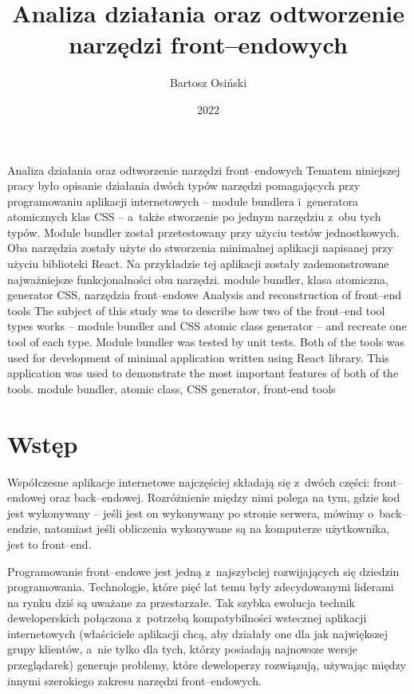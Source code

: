 \documentclass{SGGW-thesis}
\title{Analiza działania oraz odtworzenie narzędzi front--endowych}
\author{Bartosz Osiński}
\date{2022}
\begin{document}
\maketitle
\statementpage
\abstractpage
{Analiza działania oraz odtworzenie narzędzi front–endowych}
{Tematem niniejszej pracy było opisanie działania dwóch typów narzędzi pomagających przy programowaniu aplikacji internetowych -- module bundlera i~generatora atomicznych klas CSS -- a~także stworzenie po jednym narzędziu z~obu tych typów. Module bundler został przetestowany przy użyciu testów jednostkowych. Oba narzędzia zostały użyte do stworzenia minimalnej aplikacji napisanej przy użyciu biblioteki React. Na przykładzie tej aplikacji zostały zademonstrowane najważniejsze funkcjonalności obu narzędzi.}
{module bundler, klasa atomiczna, generator CSS, narzędzia front--endowe}
{Analysis and reconstruction of front--end tools}
{The subject of this study was to describe how two of the front--end tool types works -- module bundler and CSS atomic class generator -- and recreate one tool of each type. Module bundler was tested by unit tests. Both of the tools was used for development of minimal application written using React library. This application was used to demonstrate the most important features of both of the tools.}
{module bundler, atomic class, CSS generator, front-end tools}


\tableofcontents

\startchapterfromoddpage %


\chapter{Wstęp}
Współczesne aplikacje internetowe najczęściej składają się z~dwóch części: front--endowej oraz back--endowej. Rozróżnienie między nimi polega na tym, gdzie kod jest wykonywany -- jeśli jest on wykonywany po stronie serwera, mówimy o~back--endzie, natomiast jeśli obliczenia wykonywane są na komputerze użytkownika, jest to front--end.

Programowanie front--endowe jest jedną z~najszybciej rozwijających się dziedzin programowania. Technologie, które pięć lat temu były zdecydowanymi liderami na rynku dziś są uważane za przestarzałe. Tak szybka ewolucja technik deweloperskich połączona z~potrzebą kompatybilności wstecznej aplikacji internetowych (właściciele aplikacji chcą, aby działały one dla jak największej grupy klientów, a~nie tylko dla tych, którzy posiadają najnowsze wersje przeglądarek) generuje problemy, które deweloperzy rozwiązują, używając między innymi szerokiego zakresu narzędzi front--endowych.
\end{document}
